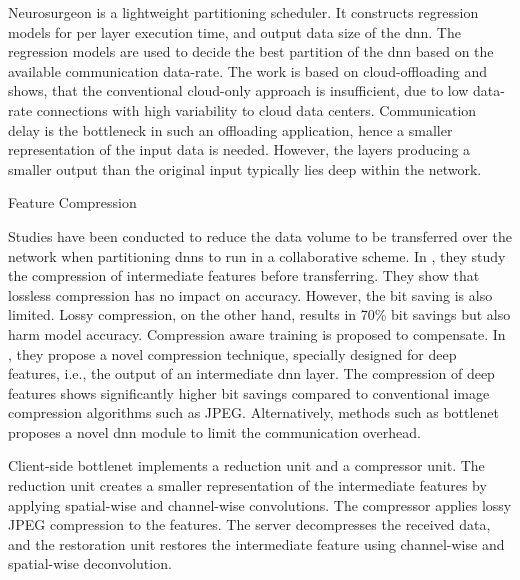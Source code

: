 Neurosurgeon \cite{kang_neurosurgeon:_2017} is a lightweight partitioning scheduler. It constructs regression models for per layer execution time, and output data size of the \gls{dnn}. The regression models are used to decide the best partition of the \gls{dnn} based on the available communication data-rate. The work is based on cloud-offloading and shows, that the conventional cloud-only approach is insufficient, due to low data-rate connections with high variability to cloud data centers. Communication delay is the bottleneck in such an offloading application, hence a smaller representation of the input data is needed. However, the layers producing a smaller output than the original input typically lies deep within the network.
\begin{enumdescript}
	\item[Feature Compression] 
	
	Studies have been conducted to reduce the data volume to be transferred over the network when partitioning \gls{dnn}s to run in a collaborative scheme.  In \cite{choi_deep_2018}, they study the compression of intermediate features before transferring. They show that lossless compression has no impact on accuracy. However, the bit saving is also limited. Lossy compression, on the other hand, results in 70\% bit savings but also harm model accuracy. Compression aware training is proposed to compensate. In \cite{choi_near-lossless_2018}, they propose a novel compression technique, specially designed for deep features, i.e., the output of an intermediate \gls{dnn} layer. The compression of deep features shows significantly higher bit savings compared to conventional image compression algorithms such as JPEG. Alternatively, methods such as \gls{bottlenet} \cite{eshratifar_bottlenet:_2019}  proposes a novel \gls{dnn} module to limit the communication overhead.
	
	
	
	Client-side \gls{bottlenet} implements a reduction unit and a compressor unit. The reduction unit creates a smaller representation of the intermediate features by applying spatial-wise and channel-wise convolutions. The compressor applies lossy JPEG compression to the features. The server decompresses the received data, and the restoration unit restores the intermediate feature using channel-wise and spatial-wise deconvolution.	
	

\end{enumdescript}

